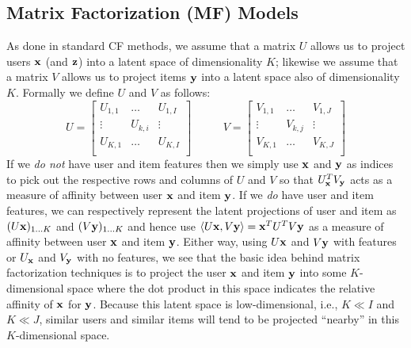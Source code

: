 \begin{comment}
This applies to the MovieLens 1 Million dataset as well. For the MovieLens 100,000 dataset, the number of items is larger than the number of users, and the user-based approach has been found to perform better.
\end{comment}

\subsection{Matrix Factorization (MF) Models}

As done in standard CF methods, we assume that
a matrix $U$ allows us to project users $\mathbf{x}$ (and $\mathbf{z}$)
into a latent space of dimensionality $K$; likewise we assume that
a matrix $V$ allows us to project items $\mathbf{y}$ into a latent
space also of dimensionality $K$.  Formally we define $U$ and $V$
as follows:
\begin{equation*}
U = 
\begin{bmatrix}
  U_{1,1} & \hdots  & U_{1,I} \\
  \vdots  & U_{k,i} & \vdots  \\
  U_{K,1} & \hdots  & U_{K,I} \\
\end{bmatrix}
\qquad \; \; \;
V = 
\begin{bmatrix}
  V_{1,1} & \hdots  & V_{1,J} \\
  \vdots  & V_{k,j} & \vdots  \\
  V_{K,1} & \hdots  & V_{K,J} \\
\end{bmatrix}
\end{equation*}
If we \emph{do not} have user and item features then we simply use
$\mathbf{x}$ and $\mathbf{y}$ as indices to pick out the respective rows and columns
of $U$ and $V$ so that $U_{\mathbf{x}}^T V_{\mathbf{y}}$ acts as a measure of affinity 
between user $\mathbf{x}$ and item $\mathbf{y}$.  If we \emph{do} have user and item
features, we can respectively represent the latent projections of user
and item as $(U \mathbf{x})_{1 \ldots K}$ and $(V \mathbf{y})_{1 \ldots K}$ and hence
use $\langle U \mathbf{x}, V \mathbf{y} \rangle = \mathbf{x}^T U^T V \mathbf{y}$ as a measure of affinity 
between user $\mathbf{x}$ and item $\mathbf{y}$.  Either way, using $U \mathbf{x}$ and $V \mathbf{y}$
with features or $U_{\mathbf{x}}$ and $V_{\mathbf{y}}$ with no features, we see that the
basic idea behind matrix factorization techniques is to project the
user $\mathbf{x}$ and item $\mathbf{y}$ into some $K$-dimensional space where the dot
product in this space indicates the relative affinity of $\mathbf{x}$ for
$\mathbf{y}$.  Because this latent space is low-dimensional, i.e., $K \ll
I$ and $K \ll J$, similar users and similar items will tend to be
projected ``nearby'' in this $K$-dimensional space.

